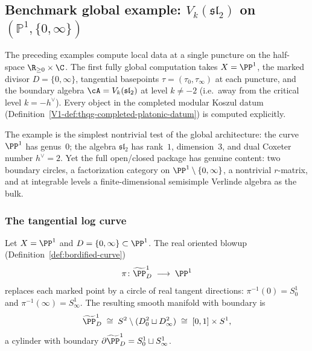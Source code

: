 %
%

\subsection{Benchmark global example: \texorpdfstring{$V_k(\mathfrak{sl}_2)$}{V\_k(sl\_2)}
 on \texorpdfstring{$(\mathbb{P}^1, \{0,\infty\})$}{(P\^1, \{0, infty\})}}
\label{subsec:benchmark-global-sl2}

The preceding examples compute local data at a single puncture
on the half-space $\R_{\ge 0} \times \C$. The first fully global computation takes
$X = \PP^1$, the marked divisor $D = \{0, \infty\}$, tangential
basepoints $\tau = (\tau_0, \tau_\infty)$ at each puncture, and
the boundary algebra $\cA = V_k(\mathfrak{sl}_2)$ at level
$k \ne -2$ (i.e.\ away from the critical level $k = -h^\vee$).
Every object in the completed modular Koszul datum
(Definition~\ref*{V1-def:thqg-completed-platonic-datum})
is computed explicitly.

The example is the simplest nontrivial test of the global
architecture: the curve $\PP^1$ has genus~$0$; the algebra
$\mathfrak{sl}_2$ has rank~$1$, dimension~$3$, and dual Coxeter
number $h^\vee = 2$. Yet the full open/closed package has genuine
content: two boundary circles, a factorization category on
$\PP^1 \setminus \{0,\infty\}$, a nontrivial $r$-matrix, and
at integrable levels a finite-dimensional semisimple Verlinde
algebra as the bulk.

\subsubsection{The tangential log curve}
\label{subsubsec:benchmark-tangential-log-curve}

Let $X = \PP^1$ and $D = \{0, \infty\} \subset \PP^1$.
The real oriented blowup
(Definition~\ref{def:bordified-curve})
\[
 \pi \colon \widetilde{\PP}^1_D
 \;\longrightarrow\;
 \PP^1
\]
replaces each marked point by a circle of real tangent directions:
$\pi^{-1}(0) = S^1_0$ and $\pi^{-1}(\infty) = S^1_\infty$.
The resulting smooth manifold with boundary is
\[
 \widetilde{\PP}^1_D
 \;\cong\;
 S^2 \setminus (D^2_0 \sqcup D^2_\infty)
 \;\cong\;
 [0,1] \times S^1,
\]
a cylinder with boundary $\partial \widetilde{\PP}^1_D
= S^1_0 \sqcup S^1_\infty$.

